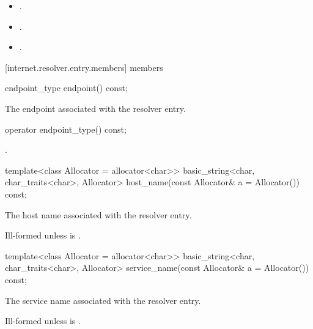 \begin{itemdescr}
\pnum
\postconditions 
\begin{itemize}
\item
{}.
\item
{}.
\item
{}.
\end{itemize}
\end{itemdescr}



[internet.resolver.entry.members]{ members}

\begin{itemdecl}
endpoint_type endpoint() const;
\end{itemdecl}

\begin{itemdescr}
\pnum
\returns The endpoint associated with the resolver entry.
\end{itemdescr}

\begin{itemdecl}
operator endpoint_type() const;
\end{itemdecl}

\begin{itemdescr}
\pnum
\returns {}.
\end{itemdescr}

\begin{itemdecl}
template<class Allocator = allocator<char>>
  basic_string<char, char_traits<char>, Allocator>
    host_name(const Allocator& a = Allocator()) const;
\end{itemdecl}

\begin{itemdescr}
\pnum
\returns The host name associated with the resolver entry.

\pnum
\remarks Ill-formed unless  is .
\end{itemdescr}

\begin{itemdecl}
template<class Allocator = allocator<char>>
  basic_string<char, char_traits<char>, Allocator>
    service_name(const Allocator& a = Allocator()) const;
\end{itemdecl}

\begin{itemdescr}
\pnum
\returns The service name associated with the resolver entry.

\pnum
\remarks Ill-formed unless  is .
\end{itemdescr}



